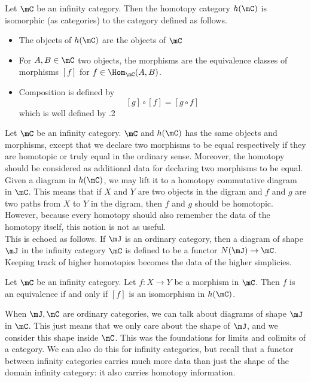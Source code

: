 \documentclass[a4paper]{article}
\begin{document}
\begin{prp}{}{} Let $\mC$ be an infinity category. Then the homotopy category $h(\mC)$ is isomorphic (as categories) to the category defined as follows. 
\begin{itemize}
\item The objects of $h(\mC)$ are the objects of $\mC$
\item For $A,B\in\mC$ two objects, the morphisms are the equivalence classes of morphisms $[f]$ for $f\in\Hom_\mC(A,B)$. 
\item Composition is defined by $$[g]\circ[f]=[g\circ f]$$ which is well defined by .2
\end{itemize}
\end{prp}

Let $\mC$ be an infinity category. $\mC$ and $h(\mC)$ has the same objects and morphisms, except that we declare two morphisms to be equal respectively if they are homotopic or truly equal in the ordinary sense. Moreover, the homotopy should be considered as additional data for declaring two morphisms to be equal. \\

Given a diagram in $h(\mC)$, we may lift it to a homotopy commutative diagram in $\mC$. This means that if $X$ and $Y$ are two objects in the digram and $f$ and $g$ are two paths from $X$ to $Y$ in the digram, then $f$ and $g$ should be homotopic. However, because every homotopy should also remember the data of the homotopy itself, this notion is not as useful. \\

This is echoed as follows. If $\mJ$ is an ordinary category, then a diagram of shape $\mJ$ in the infinity category $\mC$ is defined to be a functor $N(\mJ)\to\mC$. Keeping track of higher homotopies becomes the data of the higher simplicies. 

\begin{prp}{}{} Let $\mC$ be an infinity category. Let $f:X\to Y$ be a morphism in $\mC$. Then $f$ is an equivalence if and only if $[f]$ is an isomorphism in $h(\mC)$. 
\end{prp}

When $\mJ,\mC$ are ordinary categories, we can talk about diagrams of shape $\mJ$ in $\mC$. This just means that we only care about the shape of $\mJ$, and we consider this shape inside $\mC$. This was the foundations for limits and colimits of a category. We can also do this for infinity categories, but recall that a functor between infinity categories carries much more data than just the shape of the domain infinity category: it also carries homotopy information. 
\end{document}

